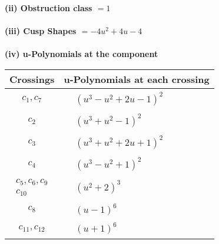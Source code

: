 \documentclass[1p]{elsarticle_modified}
\theoremstyle{definition}
\begin{document}
\flushleft \textbf{(ii) Obstruction class $= 1$}\\~\\
\flushleft \textbf{(iii) Cusp Shapes $= -4 u^2+4 u-4$}\\~\\
\newpage\renewcommand{\arraystretch}{1}
\flushleft \textbf{(iv) u-Polynomials at the component}\newline \\
\begin{tabular}{m{50pt}|m{274pt}}
Crossings & \hspace{64pt}u-Polynomials at each crossing \\
\hline $$\begin{aligned}c_{1},c_{7}\end{aligned}$$&$\begin{aligned}
&(u^3- u^2+2 u-1)^2
\end{aligned}$\\
\hline $$\begin{aligned}c_{2}\end{aligned}$$&$\begin{aligned}
&(u^3+u^2-1)^2
\end{aligned}$\\
\hline $$\begin{aligned}c_{3}\end{aligned}$$&$\begin{aligned}
&(u^3+u^2+2 u+1)^2
\end{aligned}$\\
\hline $$\begin{aligned}c_{4}\end{aligned}$$&$\begin{aligned}
&(u^3- u^2+1)^2
\end{aligned}$\\
\hline $$\begin{aligned}c_{5},c_{6},c_{9}\\c_{10}\end{aligned}$$&$\begin{aligned}
&(u^2+2)^3
\end{aligned}$\\
\hline $$\begin{aligned}c_{8}\end{aligned}$$&$\begin{aligned}
&(u-1)^6
\end{aligned}$\\
\hline $$\begin{aligned}c_{11},c_{12}\end{aligned}$$&$\begin{aligned}
&(u+1)^6
\end{aligned}$\\
\hline
\end{tabular}\\~\\
\end{document}
